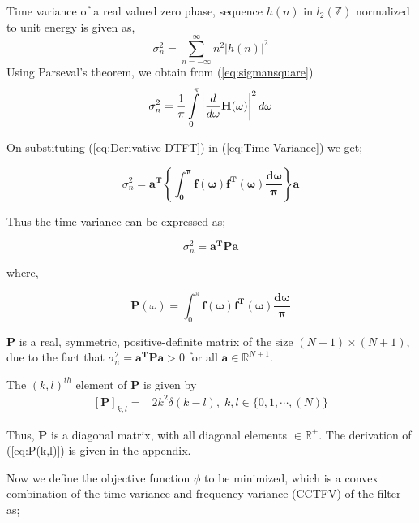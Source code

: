 Time variance of a real valued zero phase, sequence $h(n)$ in $l_{2}(\mathbb{Z})$
normalized to unit energy is given as,
\begin{equation}
\sigma_{n}^{2}=\sum_{n=-\infty}^{\infty}n^{2}|h(n)|^{2}
\label{eq:sigmansquare}
\end{equation}
Using Parseval's theorem, we obtain from (\ref{eq:sigmansquare})
\begin{equation}
\sigma_{n}^{2}=\frac{1}{\pi}\intop_{0}^{\pi}\left|\frac{d}{d\omega}\mathbf{H}(\omega)\right|^{2}d\omega\label{eq:Time Variance}\end{equation}

On substituting (\ref{eq:Derivative DTFT}) in (\ref{eq:Time Variance})
we get;

\begin{equation}
\sigma_{n}^{2}=\mathbf{a^{T}\left\{ \mathbf{\int_{0}^{\pi}}\mathbf{f(\omega)f^{T}(\omega)\frac{d\omega}{\pi}}\right\} }\mathbf{a}
\end{equation}


Thus the time variance can be expressed as;

\begin{equation}
\sigma_{n}^{2}=\mathbf{a^{T}Pa}\label{eq:TimeVarianceMatrixForm}\end{equation}


where,

\begin{equation}
\mathbf{P}(\omega)=\int_{0}^{\pi}\mathbf{f(\omega)f^{T}(\omega)\frac{d\omega}{\pi}}\label{eq:P_matrix}\end{equation}


$\mathbf{P}$ is a real, symmetric, positive-definite matrix of the size
$(N+1)\times(N+1)$, due to the fact that $\sigma_{n}^{2}=\mathbf{a^{T}Pa>}0$ for all
$\mathbf{a}\in\mathbb{R}^{N+1}$.

The $(k,l)^{th}$ element of $\mathbf{P}$ is given by
\begin{eqnarray}
\label{eq:P(k,l)}
[\mathbf{P}]_{k,l}=&2k^{2}\delta(k-l),\; k,l\in\{0,1,\cdots,(N)\}
\label{eq:p(k,l}
\end{eqnarray}

Thus, $\mathbf{P}$ is a diagonal matrix, with all diagonal elements
$\in\mathbb{R}^{+}$. The derivation of (\ref{eq:P(k,l)}) is given
in the appendix.

Now we define the objective function $\phi$ to be minimized, which
is a convex combination of the time variance and frequency variance (CCTFV)
of the filter as;


